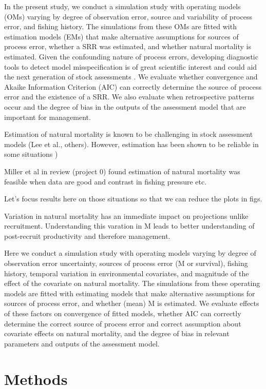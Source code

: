\documentclass[
  12pt,
]{article}
\begin{document}
In the present study, we conduct a simulation study with operating models (OMs) varying by degree of observation error, source and variability of process error, and fishing history. The simulations from these OMs are fitted with estimation models (EMs) that make alternative assumptions for sources of process error, whether a SRR was estimated, and whether natural mortality is estimated. Given the confounding nature of process errors, developing diagnostic tools to detect model misspecification is of great scientific interest and could aid the next generation of stock assessments \citep{augeretal21}. We evaluate whether convergence and Akaike Information Criterion (AIC) can correctly determine the source of process error and the existence of a SRR. We also evaluate when retrospective patterns occur and the degree of bias in the outputs of the assessment model that are important for management.

Estimation of natural mortality is known to be challenging in stock assessment models (Lee et al., others). However, estimation has been shown to be reliable in some situations \citet{millerhyun18})

Miller et al in review (project 0) found estimation of natural mortality was feasible when data are good and contrast in fishing pressure etc.

Let's focus results here on those situations so that we can reduce the plots in figs.

Variation in natural mortality has an immediate impact on projections unlike recruitment. Understanding this varation in M leads to better understanding of post-recruit productivity and therefore management.

Here we conduct a simulation study with operating models varying by degree of observation error uncertainty, sources of process error (M or survival), fishing history, temporal variation in environmental covariates, and magnitude of the effect of the covariate on natural mortality. The simulations from these operating models are fitted with estimating models that make alternative assumptions for sources of process error, and whether (mean) M is estimated. We evaluate effects of these factors on convergence of fitted models, whether AIC can correctly determine the correct source of process error and correct assumption about covariate effects on natural mortality, and the degree of bias in relevant parameters and outputs of the assessment model.

\hypertarget{methods}{%
\section*{Methods}\label{methods}}
\end{document}
